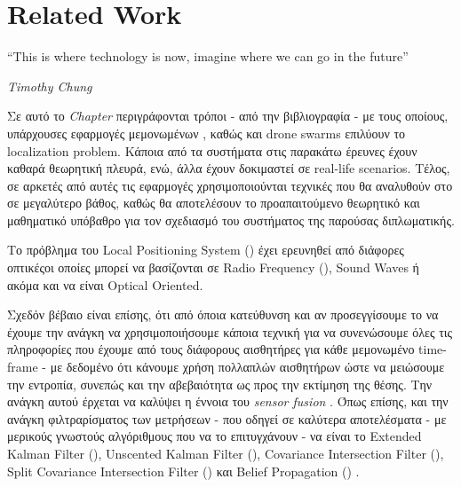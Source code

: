\chapter{Related Work} \label{chap:Chapter2}       
\epigraph{``This is where technology is now, imagine where we can go in the future” }{\textit{Timothy Chung}}

Σε αυτό το \emph{Chapter} περιγράφονται τρόποι - από την βιβλιογραφία - με τους οποί\-ους, υπάρχουσες εφαρμογές 
μεμονωμένων , καθώς και drone swarms επιλύουν το localization pro\-blem. Κάποια από τα συστήματα στις 
παρακάτω έρευνες έχουν καθαρά θεωρητική πλευρά, ενώ, άλλα έχουν δοκιμαστεί σε real-life scenarios.
Τέλος, σε α\-ρκε\-τές από αυτές τις εφαρμογές χρησιμοποιούνται τεχνικές που θα αναλυθούν στο 
σε μεγαλύτερο βάθος, καθώς θα αποτελέσουν το προαπαιτούμενο θεωρητικό και μαθηματικό υπόβαθρο για τον σχεδιασμό 
του συστήματος της παρούσας διπλωματικής.

Το πρόβλημα του Local Positioning System () \cite{lps} έχει ερευνηθεί από διάφορες οπτικές\udot οι 
οποίες μπορεί να βασίζονται σε Radio Frequency (), Sound Waves ή ακόμα και να είναι Optical Oriented.

Σχεδόν βέβαιο είναι επίσης, ότι από όποια κατεύθυνση και αν προσεγγίσουμε το  να έχουμε την ανάγκη να 
χρησιμοποιήσουμε κάποια τεχνική για να συνενώσουμε όλες τις πληροφορίες που έχουμε από τους διάφορους αισθητήρες 
για κάθε μεμονωμένο time-frame - με δεδομένο ότι κάνουμε χρήση πολλαπλών αισθητήρων ώστε να μειώσουμε την εντροπία, 
συνεπώς και την αβεβαιότητα ως προς την εκτίμηση της θέσης. 
Την ανάγκη αυτού έρχεται να καλύψει η έννοια του \emph{sensor fusion} \cite{sensor-fusion}. Όπως επίσης, και την 
ανάγκη φιλτραρίσματος των μετρήσεων - που οδηγεί σε καλύτερα αποτε\-λέ\-σμα\-τα - με μερικούς γνωστούς αλγόριθμους 
που να το επιτυγχάνουν - να είναι το Extended Kalman Filter (), Unscented Kalman Filter (), 
Covariance Intersection Filter (),  Split  Covariance  Intersection  Filter () και  Belief  
Propagation () \cite{fusion-filters}. 

